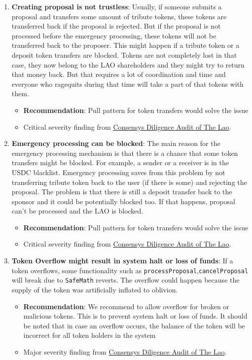 \begin{enumerate}
\item\textbf{Creating proposal is not trustless}: Usually, if someone submits a proposal and transfers some amount of tribute tokens, these tokens are transferred back if the proposal is rejected. But if the proposal is not processed before the emergency processing, these tokens will not be transferred back to the proposer. This might happen if a tribute token or a deposit token transfers are blocked. Tokens are not completely lost in that case, they now belong to the LAO shareholders and they might try to return that money back. But that requires a lot of coordination and time and everyone who ragequits during that time will take a part of that tokens with them.
	\begin{itemize}
	\item\textbf{Recommendation}: Pull pattern for token transfers would solve the issue
	\item Critical severity finding from \href{https://consensys.net/diligence/audits/2020/01/the-lao}{Consensys Diligence Audit of The Lao}.
	\end{itemize}

\item\textbf{Emergency processing can be blocked}: The main reason for the emergency processing mechanism is that there is a chance that some token transfers might be blocked. For example, a sender or a receiver is in the USDC blacklist. Emergency processing saves from this problem by not transferring tribute token back to the user (if there is some) and rejecting the proposal. The problem is that there is still a deposit transfer back to the sponsor and it could be potentially blocked too. If that happens, proposal can’t be processed and the LAO is blocked.
	\begin{itemize}
	\item\textbf{Recommendation}: Pull pattern for token transfers would solve the issue
	\item Critical severity finding from \href{https://consensys.net/diligence/audits/2020/01/the-lao}{Consensys Diligence Audit of The Lao}.
	\end{itemize}

\item\textbf{Token Overflow might result in system halt or loss of funds}: If a token overflows, some functionality such as \verb|processProposal|,\linebreak\verb|cancelProposal| will break due to \verb|SafeMath| reverts. The overflow could happen because the supply of the token was artificially inflated to oblivion.
	\begin{itemize}
	\item\textbf{Recommendation}: We recommend to allow overflow for broken or malicious tokens. This is to prevent system halt or loss of funds. It should be noted that in case an overflow occurs, the balance of the token will be incorrect for all token holders in the system
	\item Major severity finding from \href{https://consensys.net/diligence/audits/2020/01/the-lao}{Consensys Diligence Audit of The Lao}.
	\end{itemize}


\end{enumerate}
